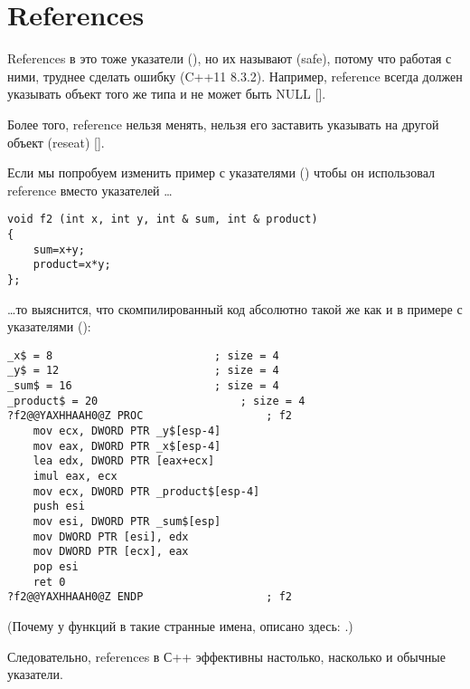 \section{References}
\label{cpp_references}

References в \Cpp это тоже указатели (), но их называют  (safe), потому что работая с ними, труднее сделать ошибку (C++11 8.3.2). %
Например, reference всегда должен указывать объект того же типа и не может быть NULL
[].

Более того, reference нельзя менять, нельзя его заставить указывать на другой объект (reseat)
[].

Если мы попробуем изменить пример с указателями () 
чтобы он использовал reference вместо указателей \dots

\begin{lstlisting}
void f2 (int x, int y, int & sum, int & product)
{
	sum=x+y;
	product=x*y;
};
\end{lstlisting}

\dots то выяснится, что скомпилированный код абсолютно такой 
же как и в примере с указателями ():

\begin{lstlisting}[caption=\Optimizing MSVC 2010]
_x$ = 8							; size = 4
_y$ = 12						; size = 4
_sum$ = 16						; size = 4
_product$ = 20						; size = 4
?f2@@YAXHHAAH0@Z PROC					; f2
	mov	ecx, DWORD PTR _y$[esp-4]
	mov	eax, DWORD PTR _x$[esp-4]
	lea	edx, DWORD PTR [eax+ecx]
	imul eax, ecx
	mov ecx, DWORD PTR _product$[esp-4]
	push esi
	mov	esi, DWORD PTR _sum$[esp]
	mov	DWORD PTR [esi], edx
	mov	DWORD PTR [ecx], eax
	pop	esi
	ret	0
?f2@@YAXHHAAH0@Z ENDP					; f2
\end{lstlisting}

(Почему у функций в \Cpp такие странные имена, описано здесь: .)

Следовательно, references в С++ эффективны настолько, насколько и обычные указатели.

